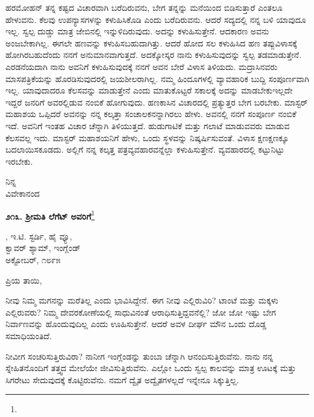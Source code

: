 ಹರಮೋಹನ್ ತನ್ನ ಕಷ್ಟದ ವಿಚಾರವಾಗಿ ಬರೆದಿರುವನು, ಬೇಗ ತನ್ನನ್ನು ಮನೆಯಿಂದ ಬಿಡಿಸುತ್ತಾರೆ ಎಂತಲೂ ಹೇಳುವನು. ಕೆಲವು ಉಪನ್ಯಾಸಗಳನ್ನು ಕಳುಹಿಸಿಕೊಡಿ ಎಂದು ಬರೆದಿರುವನು. ಆದರೆ ಸದ್ಯದಲ್ಲಿ ನನ್ನ ಬಳಿ ಯಾವುದೂ ಇಲ್ಲ. ಸ್ವಲ್ಪ ದುಡ್ಡು ಮಾತ್ರ ಜೇಬಿನಲ್ಲಿ ಇನ್ನುಳಿದಿರುವುದು. ಅದನ್ನು ಕಳುಹಿಸುತ್ತೇನೆ. ಆದಕಾರಣ ಅವನು ಅಂಜಬೇಕಾಗಿಲ್ಲ. ಈಗಲೇ ಹಣವನ್ನು ಕಳುಹಿಸಬಹುದಾಗಿತ್ತು. ಆದರೆ ಹೋದ ಸಲ ಕಳುಹಿಸಿದ ಹಣ ತಪ್ಪುವಿಳಾಸಕ್ಕೆ ಹೋಗಿರಬಹುದೆಂದು ನನಗೆ ಅನುಮಾನವಾಗುತ್ತದೆ. ಅದಕ್ಕೋಸ್ಕರ ನಾನು ಕಳುಹಿಸುವುದನ್ನು ಸ್ವಲ್ಪ ತಡಮಾಡುತ್ತೇನೆ. ಎರಡನೆಯದಾಗಿ ನಾನು ಅವನಿಗೆ ಕಳುಹಿಸುವುದಕ್ಕೆ ನನಗೆ ಅವನ ಬೇರೆ ವಿಳಾಸ ತಿಳಿಯದು. ಮದ್ರಾಸಿನವರು ಮಾಸಪತ್ರಿಕೆಯನ್ನು ಹೊರಡಿಸುವುದರಲ್ಲಿ ಜಯಶೀಲರಾಗಿಲ್ಲ. ನಮ್ಮ ಹಿಂದೂಗಳಲ್ಲಿ ವ್ಯಾವಹಾರಿಕ ಬುದ್ದಿ ಸಂಪೂರ್ಣವಾಗಿ ಇಲ್ಲ. ಯಾವುದಾದರೂ ಕೆಲಸವನ್ನು ಮಾಡುತ್ತೇನೆ ಎಂದು ಮಾತುಕೊಟ್ಟರೆ ಸಕಾಲಕ್ಕೆ ಅದನ್ನು ಮಾಡಬೇಕು\enginline{-}ಇಲ್ಲದೇ ಇದ್ದರೆ ಜನರಿಗೆ ಅವರಲ್ಲಿಡುವ ನಂಬಿಕೆ ಹೋಗುವುದು. ಹಣಕಾಸಿನ ವಿಚಾರದಲ್ಲಿ ಪ್ರತ್ಯುತ್ತರ ಬೇಗ ಬರಬೇಕು. ಮಾಸ್ಟರ್ ಮಹಾಶಯ ಒಪ್ಪಿದರೆ ಅವನನ್ನು ನನ್ನ ಕಲ್ಕತ್ತಾ ಸಂಚಾಲಕನನ್ನಾಗಿರಲು ಹೇಳು. ಅವನಲ್ಲಿ ನನಗೆ ಸಂಪೂರ್ಣ ನಂಬಿಕೆ ಇದೆ. ಅವನಿಗೆ ಇಂತಹ ವಿಚಾರ ಚೆನ್ನಾಗಿ ತಿಳಿಯುತ್ತದೆ. ಹುಡುಗಾಟಿಕೆ ಮತ್ತು ಗಲಾಟೆ ಮಾಡುವವರು ಮಾಡುವ ಕೆಲಸವಲ್ಲ ಇದು. ಮಾಸ್ಟರ್ ಮಹಾಶಯನಿಗೆ ಹೇಳು, ಒಂದು ಸ್ಥಳವನ್ನು ನಿಷ್ಕರ್ಷಿಸುವಂತೆ. ವಿಳಾಸ ಕ್ಷಣಕ್ಷಣಕ್ಕೂ ಬದಲಾಯಿಸಕೂಡದು. ಅಲ್ಲಿಗೆ ನನ್ನ ಕಲ್ಕತ್ತ ಪತ್ರವ್ಯವಹಾರವನ್ನೆಲ್ಲಾ ಕಳುಹಿಸುತ್ತೇನೆ. ವ್ಯವಹಾರದಲ್ಲಿ ಕಟ್ಟುನಿಟ್ಟು ಇರಬೇಕು.

{\flushright
ನಿನ್ನ\\ವಿವೇಕಾನಂದ\par}

\newpage

\begin{center}
\textbf{೨೧೩. ಶ‍್ರೀಮತಿ ಲೆಗೆಟ್ ಅವರಿಗೆ}\footnote{}
\end{center}

\vspace{-0.65cm}

\begin{flushright}
, ಇ.ಟಿ. ಸ್ಟರ್ಡಿ, ಹೈ ವ್ಯೂ,\\ಕ್ವಾವರ್ ಶ್ಯಾಮ್, ಇಂಗ್ಲೆಂಡ್\\ಅಕ್ಟೋಬರ್, ೧೮೯೫
\end{flushright}

\vspace{-0.3cm}

\noindent
ಪ್ರಿಯ ತಾಯಿ,

ನೀವು ನಿಮ್ಮ ಮಗನನ್ನು ಮರೆತಿಲ್ಲ ಎಂದು ಭಾವಿಸಿದ್ದೇನೆ. ಈಗ ನೀವು ಎಲ್ಲಿರುವಿರಿ? ಟಾಂಟೆ ಮತ್ತು ಮಕ್ಕಳು ಎಲ್ಲಿರುವರು? ನಿಮ್ಮ ದೇವರಕೋಣೆಯಲ್ಲಿ ಸಾಧುವಿನಂತೆ ಆರಾಧಿಸುತ್ತಿದ್ದವನೆಲ್ಲಿ? ಜೋ ಜೋ ಇಷ್ಟು ಬೇಗ ನಿರ್ವಾಣವನ್ನು ಹೊಂದುವುದಿಲ್ಲ ಎಂದು ಊಹಿಸುತ್ತೇನೆ. ಆದರೆ ಅವಳ ದೀರ್ಘ ಮೌನ ಒಂದು ದೊಡ್ಡ ಸಮಾಧಿಯಂತಿದೆ.

ನೀವೀಗ ಸಂಚರಿಸುತ್ತಿರುವಿರಾ? ನಾನೀಗ ಇಂಗ್ಲೆಂಡನ್ನು ತುಂಬಾ ಚೆನ್ನಾಗಿ ಆನಂದಿಸು\break ತ್ತಿರುವೆನು. ನಾನು ನನ್ನ ಸ್ನೇಹಿತನೊಂದಿಗೆ ತತ್ತ್ವದ ಮೇಲೆಯೇ ಜೀವಿಸುತ್ತಿರುವೆನು. ಎಲ್ಲೋ ಒಂದು ಸ್ವಲ್ಪ ಕಾಲವನ್ನು ಮಾತ್ರ ಊಟಕ್ಕೆ ಮತ್ತು ಸಿಗರೇಟು ಸೇದುವುದಕ್ಕೆ ಕೊಟ್ಟಿರುವೆನು. ನಮಗೆ ದ್ವೈತ ಅದ್ವೈತಗಳಲ್ಲದೆ ಇನ್ನೇನೂ ಸಿಕ್ಕುತ್ತಿಲ್ಲ.

